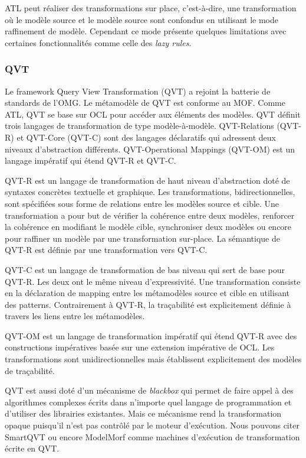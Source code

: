 ATL peut réaliser des transformations sur  place, c'est-à-dire, une transformation où le modèle source et le modèle source sont confondus en utilisant le mode raffinement de modèle. Cependant ce mode présente quelques limitations avec certaines fonctionnalités comme celle des \textit{lazy rules}.

\subsubsection{QVT}
Le framework Query View Transformation (QVT) \cite{kurtev2008state} \cite{omg2011meta} a rejoint la batterie de standards de l'OMG. Le métamodèle de QVT est conforme au MOF. Comme ATL, QVT se base sur OCL pour accéder aux éléments des modèles.
QVT définit trois langages de transformation de type modèle-à-modèle. QVT-Relations (QVT-R) et QVT-Core (QVT-C) sont des langages déclaratifs qui adressent deux niveaux d'abstraction différents. QVT-Operational Mappings (QVT-OM) est un langage impératif qui étend QVT-R et QVT-C.

QVT-R est un langage de transformation de haut niveau d'abstraction doté de syntaxes concrètes textuelle et graphique. Les transformations, bidirectionnelles, sont spécifiées sous forme de relations entre les modèles source et cible. Une transformation a pour but de vérifier la cohérence entre deux modèles, renforcer la cohérence en modifiant le modèle cible, synchroniser deux modèles ou encore pour raffiner un modèle par une transformation sur-place. La sémantique de QVT-R est définie par une transformation vers QVT-C.

QVT-C est un langage de transformation de bas niveau qui sert de base pour QVT-R. Les deux ont le même niveau d'expressivité. Une transformation consiste en la déclaration de mapping entre les métamodèles source et cible en utilisant des patterns. Contrairement à QVT-R, la traçabilité est explicitement définie à travers les liens entre les métamodèles.

QVT-OM est un langage de transformation impératif qui étend QVT-R avec des constructions impératives basée sur une extension impérative de OCL. Les transformations sont unidirectionnelles mais établissent explicitement des modèles de traçabilité.

QVT est aussi doté d'un mécanisme de \textit{blackbox} qui permet de faire appel à des algorithmes complexes écrits dans n'importe quel langage de programmation et d'utiliser des librairies existantes. Mais ce mécanisme rend la transformation opaque puisqu'il n'est pas contrôlé par le moteur d'exécution. Nous pouvons citer SmartQVT ou encore ModelMorf comme machines d'exécution de transformation écrite en QVT.

